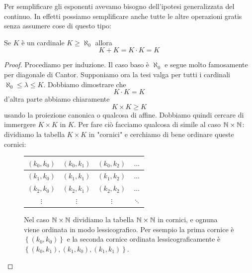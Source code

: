 \documentclass[11pt]{scrartcl}
\begin{document}
 	Per semplificare gli esponenti avevamo bisogno dell'ipotesi generalizzata del continuo. In effetti possiamo semplificare anche tutte le altre operazioni gratis senza assumere cose di questo tipo:
 	\begin{proposition}
 		Se $K$ è un cardinale $K\ge \aleph_0$ allora
 		$$K+K=K\cdot K=K$$
 	\end{proposition}
 	\begin{proof}
 		Procediamo per induzione. Il caso baso è $\aleph_0$ e segue molto famosamente per diagonale di Cantor. Supponiamo ora la tesi valga per tutti i cardinali $\aleph_0\le\lambda\le K$. Dobbiamo dimostrare che 
 		$$K\cdot K=K$$
 		d'altra parte abbiamo chiaramente
 		$$K\times K \ge K$$
 		usando la proiezione canonica o qualcosa di affine. Dobbiamo quindi cercare di immergere $K\times K$ in $K$. Per fare ciò facciamo qualcosa di simile al caso $\mathbb N\times \mathbb N$: dividiamo la tabella $K\times K$ in "cornici" e cerchiamo di bene ordinare queste cornici:
 			\begin{figure}[h]
 				\begin{center}
 					\begin{tabular}{|c|c|c|c}
 						\hline
 						$\left(k_0,k_0\right)$ & $\left(k_0,k_1\right)$ & $\left(k_0,k_2\right)$ & $\dots$ \\
 						\hline
 						$\left(k_1,k_0\right)$ & $\left(k_1,k_1\right)$ & $\left(k_1,k_2\right)$ & $\dots$ \\
 						\hline
 						$\left(k_2,k_0\right)$ & $\left(k_2,k_1\right)$ & $\left(k_2,k_2\right)$ & $\dots$ \\
 						\hline 
 						$\vdots$ & $\vdots$ & $\vdots$ & $\ddots$
 					\end{tabular}
 				\end{center}
 				\label{fig1}
 				\caption{Nel caso $\mathbb N\times \mathbb N$ dividiamo la tabella $\mathbb N\times \mathbb N$ in cornici, e ognuna viene ordinata in modo lessicografico. Per esempio la prima cornice è $\left\{(k_0,k_0)\right\}$ e la seconda cornice ordinata lessicograficamente è $\left\{(k_0,k_1),(k_1,k_0),(k_1,k_1)\right\}$.}
 			\end{figure}
 		

\end{proof}
\end{document}
